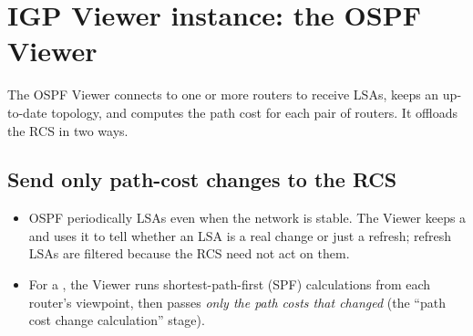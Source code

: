 \section{IGP Viewer instance: the OSPF Viewer}
The OSPF Viewer connects to one or more routers to receive LSAs, keeps an up-to-date topology, and computes the path cost for each pair of routers. It offloads the RCS in two ways.

\subsection{Send only path-cost changes to the RCS}
\begin{itemize}
\item OSPF periodically  LSAs even when the network is stable. The Viewer keeps a  and uses it to tell whether an LSA is a real change or just a refresh; refresh LSAs are filtered because the RCS need not act on them.
\item For a , the Viewer runs shortest-path-first (SPF) calculations from each router's viewpoint, then passes \emph{only the path costs that changed} (the ``path cost change calculation'' stage).
\end{itemize}

